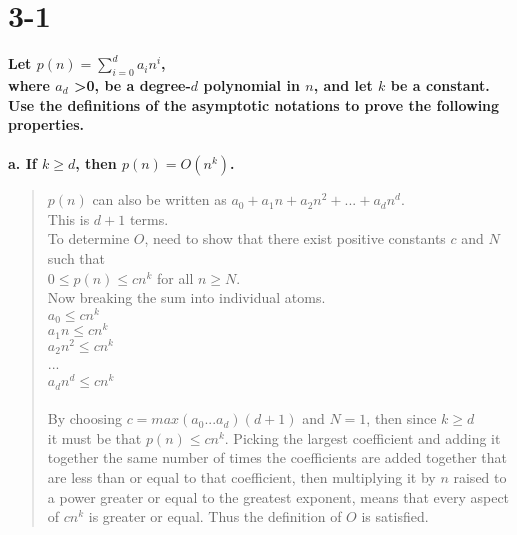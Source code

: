\documentclass{article}
\begin{document}
\section*{3-1}
\textbf{Let $p(n) = \displaystyle\sum\limits_{i=0}^d a_{i}n^{i}$,\\
where $a_{d}$ \textgreater 0, be a degree-$d$ polynomial in $n$, and let $k$ be a
 constant. Use the definitions of the asymptotic notations to prove the following properties.\\\\}
\textbf{a. If $k \geq d$, then $p(n) = O(n^{k})$.\\}
\begin{quote}
\textsf{$p(n)$ can also be written as $a_{0} + a_{1}n + a_{2}n^{2} + ... + a_{d}n^{d}$.\\
This is $d+1$ terms.\\
To determine $O$, need to show that there exist positive constants $c$ and $N$ such that\\
$0 \leq p(n) \leq cn^{k}$ for all $n \geq N$.\\
Now breaking the sum into individual atoms.\\
$a_{0} \leq cn^{k}$\\
$a_{1}n \leq cn^{k}$\\
$a_{2}n^{2} \leq cn^{k}$\\
...\\
$a_{d}n^{d} \leq cn^{k}$\\
\\
By choosing $c = max(a_{0}...a_{d})(d+1)$ and $N = 1$, then since $k \geq d$\\
it must be that $p(n) \leq cn^{k}$. Picking the largest coefficient and adding it together
the same number of times the coefficients are added together that are less than or equal to that coefficient,
then multiplying it by $n$ raised to a power greater or equal to the greatest exponent, means that every
aspect of $cn^{k}$ is greater or equal. Thus the definition of $O$ is satisfied.\\}
\end{quote}

\pagebreak
\end{document}
